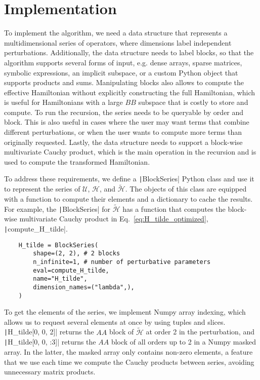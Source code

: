 \section{Implementation}

To implement the algorithm, we need a data structure that represents a
multidimensional series of operators, where dimensions label independent
perturbations.
Additionally, the data structure needs to label blocks, so that the algorithm
supports several forms of input, e.g. dense arrays, sparse matrices, symbolic
expressions, an implicit subspace, or a custom Python object that supports
products and sums.
Manipulating blocks also allows to compute the effective Hamiltonian without
explicitly constructing the full Hamiltonian, which is useful for Hamiltonians
with a large $BB$ subspace that is costly to store and compute.
To run the recursion, the series needs to be queryable by order and block.
This is also useful in cases where the user may want terms that combine
different perturbations, or when the user wants to compute more terms than
originally requested.
Lastly, the data structure needs to support a block-wise multivariate Cauchy
product, which is the main operation in the recursion and is used to compute
the transformed Hamiltonian.

To address these requirements, we define a \texttt|BlockSeries|
Python class and use it to represent the series of $\mathcal{U}$,
$\mathcal{H}$, and $\tilde{\mathcal{H}}$.
The objects of this class are equipped with a function to compute their elements
and a dictionary to cache the results.
For example, the \texttt|BlockSeries| for $\tilde{\mathcal{H}}$ has
a function that computes the block-wise multivariate Cauchy product in
Eq.~\eqref{eq:H_tilde_optimized}, \texttt|compute_H_tilde|.
%
\begin{verbatim}
    H_tilde = BlockSeries(
        shape=(2, 2), # 2 blocks
        n_infinite=1, # number of perturbative parameters
        eval=compute_H_tilde,
        name="H_tilde",
        dimension_names=("lambda",),
    )
\end{verbatim}
%
To get the elements of the series, we implement Numpy array indexing,
which allows us to request several elements at once by using tuples and slices.
\texttt|H_tilde[0, 0, 2]| returns the $AA$ block of
$\tilde{\mathcal{H}}$ at order 2 in the perturbation, and
\texttt|H_tilde[0, 0, :3]| returns the $AA$ block of all orders up
to 2 in a Numpy masked array.
In the latter, the masked array only contains non-zero elements, a feature that
we use each time we compute the Cauchy products between series, avoiding
unnecessary matrix products.

